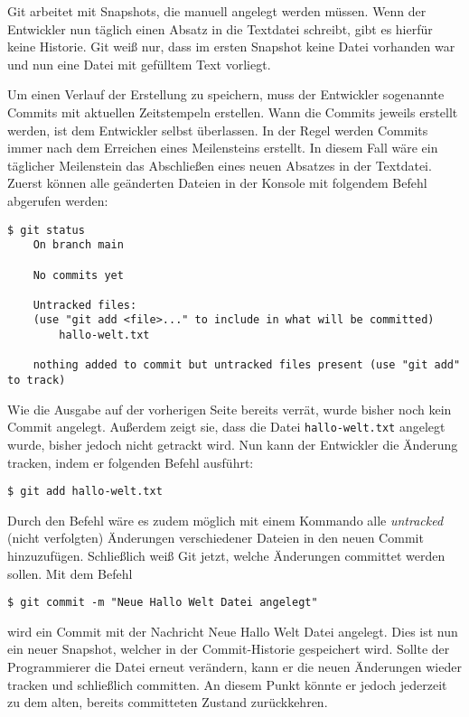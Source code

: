 Git arbeitet mit Snapshots, die manuell angelegt werden müssen. Wenn der
Entwickler nun täglich einen Absatz in die Textdatei schreibt, gibt es hierfür
keine Historie. Git weiß nur, dass im ersten Snapshot keine Datei vorhanden war
und nun eine Datei mit gefülltem Text vorliegt.

Um einen Verlauf der Erstellung zu speichern, muss der Entwickler sogenannte
Commits mit aktuellen Zeitstempeln erstellen. Wann die Commits jeweils erstellt
werden, ist dem Entwickler selbst überlassen. In der Regel werden Commits immer
nach dem Erreichen eines Meilensteins erstellt. In diesem Fall wäre ein
täglicher Meilenstein das Abschließen eines neuen Absatzes in der Textdatei.
Zuerst können alle geänderten Dateien in der Konsole mit folgendem Befehl
abgerufen werden:

\begin{lstlisting}[style=Bash]
    $ git status
    On branch main

    No commits yet

    Untracked files:
    (use "git add <file>..." to include in what will be committed)
        hallo-welt.txt

    nothing added to commit but untracked files present (use "git add" to track)
\end{lstlisting}

\newpage

Wie die Ausgabe auf der vorherigen Seite bereits verrät, wurde bisher noch kein
Commit angelegt. Außerdem zeigt sie, dass die Datei \texttt{hallo-welt.txt}
angelegt wurde, bisher jedoch nicht getrackt wird. Nun kann der Entwickler die
Änderung tracken, indem er folgenden Befehl ausführt:

\begin{lstlisting}[style=Bash]
    $ git add hallo-welt.txt
\end{lstlisting}

Durch den Befehl  wäre es zudem möglich mit einem Kommando alle
\emph{untracked} (nicht verfolgten) Änderungen verschiedener Dateien in den
neuen Commit hinzuzufügen. Schließlich weiß Git jetzt, welche Änderungen
committet werden sollen. Mit dem Befehl

\begin{lstlisting}[style=Bash]
    $ git commit -m "Neue Hallo Welt Datei angelegt"
\end{lstlisting}

\noindent
wird ein Commit mit der Nachricht \glqq Neue Hallo Welt Datei\grqq{} angelegt.
Dies ist nun ein neuer Snapshot, welcher in der Commit-Historie gespeichert
wird. Sollte der Programmierer die Datei erneut verändern, kann er die neuen
Änderungen wieder tracken und schließlich committen. An diesem Punkt könnte er
jedoch jederzeit zu dem alten, bereits committeten Zustand zurückkehren.

